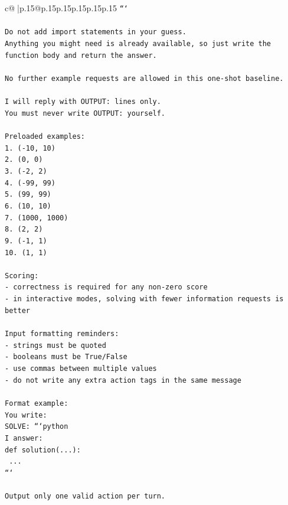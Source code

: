 \documentclass{article}
\begin{document}
{\begin{supertabular}{c@{$\;$}|p{.15\linewidth}@{}p{.15\linewidth}p{.15\linewidth}p{.15\linewidth}p{.15\linewidth}p{.15\linewidth}}
{{{\texttt{```} \\
\\ 
\texttt{Do not add import statements in your guess.} \\
\texttt{Anything you might need is already available, so just write the function body and return the answer.} \\
\\ 
\texttt{No further example requests are allowed in this one{-}shot baseline.} \\
\\ 
\texttt{I will reply with OUTPUT: lines only.} \\
\texttt{You must never write OUTPUT: yourself.} \\
\\ 
\texttt{Preloaded examples:} \\
\texttt{1. ({-}10, 10)} \\
\texttt{2. (0, 0)} \\
\texttt{3. ({-}2, 2)} \\
\texttt{4. ({-}99, 99)} \\
\texttt{5. (99, 99)} \\
\texttt{6. (10, 10)} \\
\texttt{7. (1000, 1000)} \\
\texttt{8. (2, 2)} \\
\texttt{9. ({-}1, 1)} \\
\texttt{10. (1, 1)} \\
\\ 
\texttt{Scoring:} \\
\texttt{{-} correctness is required for any non{-}zero score} \\
\texttt{{-} in interactive modes, solving with fewer information requests is better} \\
\\ 
\texttt{Input formatting reminders:} \\
\texttt{{-} strings must be quoted} \\
\texttt{{-} booleans must be True/False} \\
\texttt{{-} use commas between multiple values} \\
\texttt{{-} do not write any extra action tags in the same message} \\
\\ 
\texttt{Format example:} \\
\texttt{You write:} \\
\texttt{SOLVE: ```python} \\
\texttt{I answer:} \\
\texttt{def solution(...):} \\
\texttt{    ...} \\
\texttt{```} \\
\\ 
\texttt{Output only one valid action per turn.} \\
            }
        }
    }
     \\ \\


\end{supertabular}}
\end{document}
